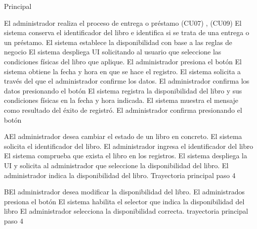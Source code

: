 	\begin{UCtrayectoria}{Principal}

			\UCpaso[\UCactor] El administrador  realiza el proceso de entrega o préstamo \UCref(CU07) , \UCref(CU09) 
			\UCpaso[\UCsist] El sistema conserva el identificador del libro e identifica si se trata de una entrega o un préstamo.
			\UCpaso[\UCsist] El sistema establece la disponibilidad con base a las reglas de negocio   
			\UCpaso[\UCsist] El sistema despliega UI solicitando al usuario que seleccione las  condiciones físicas del libro que aplique.
			\UCpaso[\UCactor] El administrador presiona el botón 
			\UCpaso[\UCsist] El sistema obtiene la fecha y hora en  que se hace el registro.
			\UCpaso[\UCsist] El sistema solicita a través del   que el administrador confirme los datos.
			\UCpaso[\UCactor] El administrador confirma los datos presionando el botón  
			\UCpaso[\UCsist] El sistema registra la  disponibilidad del libro y sus condiciones físicas en la fecha y hora indicada.
			\UCpaso[\UCsist] El sistema muestra el mensaje  como resultado del éxito de registró.
			\UCpaso[\UCactor] El administrador confirma presionando el botón  

	\end{UCtrayectoria}
		\begin{UCtrayectoriaA}{A}{El administrador desea cambiar el estado de un libro en concreto.}
			\UCpaso[\UCsist]  El sistema solicita el identificador del libro.
			\UCpaso[\UCactor] El administrador ingresa el identificador del libro 
			\UCpaso[\UCsist] El sistema comprueba que exista el libro en los registros.
			\UCpaso[\UCsist] El sistema despliega la UI y solicita al administrador que seleccione la disponibilidad del libro.
			\UCpaso[\UCactor] El administrador indica la disponibilidad del libro.
			     Trayectoria principal paso 4 
		\end{UCtrayectoriaA}

		\begin{UCtrayectoriaA}{B}{El administrador desea modificar la disponibilidad del libro.}
			\UCpaso[\UCactor] El administrados presiona el botón 
			\UCpaso[\UCsist] El sistema habilita el selector que indica la disponibilidad del libro
			\UCpaso[\UCactor] El administrador selecciona la disponibilidad correcta.
			 trayectoria principal paso 4 
		\end{UCtrayectoriaA}

